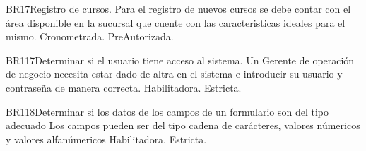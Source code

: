 \begin{BussinesRule}{BR17}{Registro de cursos.} 
	\BRitem[Descripción:] Para el registro de nuevos cursos se debe contar con el área disponible en la sucursal que cuente con las caracteristicas ideales para el mismo.
	\BRitem[Tipo:] Cronometrada.
	\BRitem[Nivel:] PreAutorizada.
\end{BussinesRule}


\begin{BussinesRule}{BR117}{Determinar si el usuario tiene acceso al sistema.} 
	\BRitem[Descripción:] Un Gerente de operación de negocio necesita estar dado de altra en el sistema e introducir su usuario y contraseña de manera correcta.
	\BRitem[Tipo:] Habilitadora.
	\BRitem[Nivel:] Estricta.
\end{BussinesRule}

\begin{BussinesRule}{BR118}{Determinar si los datos de los campos de un formulario son del tipo adecuado} 
	\BRitem[Descripción:] Los campos pueden ser del tipo cadena de carácteres, valores númericos y valores alfanúmericos
	\BRitem[Tipo:] Habilitadora.
	\BRitem[Nivel:] Estricta.
\end{BussinesRule}


